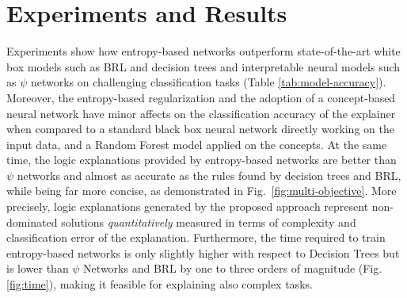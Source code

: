 \section{Experiments and Results}

Experiments show how entropy-based networks outperform state-of-the-art white box models such as BRL and decision trees
and interpretable neural models such as $\psi$ networks on challenging classification tasks (Table \ref{tab:model-accuracy}). 
Moreover, the entropy-based regularization and the adoption of a concept-based neural network have minor affects on the classification accuracy of the explainer when compared to
a standard black box neural network
directly working on the input data, and a Random Forest model applied on the concepts.%
At the same time, the logic explanations provided by entropy-based networks are better than $\psi$ networks and almost as accurate as the rules found by decision trees and BRL, while being far more concise, as demonstrated in Fig.~\ref{fig:multi-objective}. 
More precisely, logic explanations generated by the proposed approach represent non-dominated solutions \citep{marler2004survey} \textit{quantitatively} measured in terms of complexity and classification error of the explanation. %
Furthermore, the time required to train entropy-based networks is only slightly higher with respect to Decision Trees but is lower than $\psi$ Networks and BRL by one to three orders of magnitude (Fig. \ref{fig:time}), making it feasible for explaining also complex tasks. 
